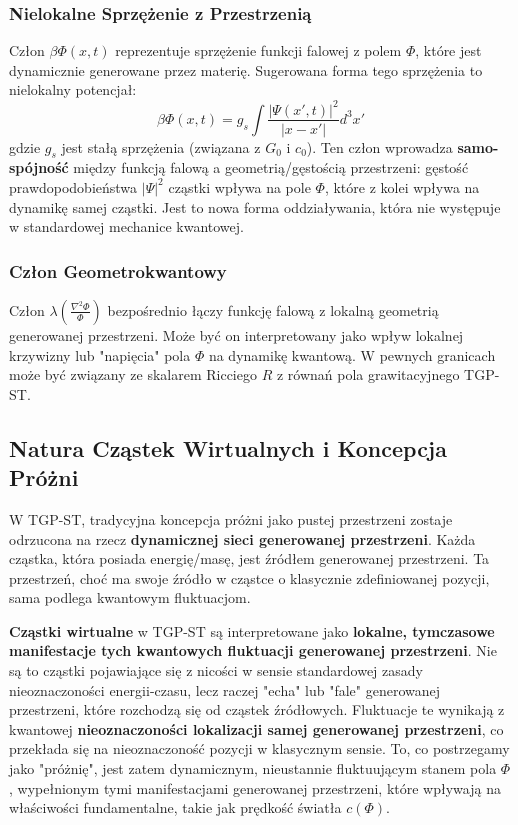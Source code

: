 \documentclass[11pt,a4paper]{article}
\begin{document}
\subsubsection{Nielokalne Sprzężenie z Przestrzenią}
Człon $\beta\Phi(x,t)$ reprezentuje sprzężenie funkcji falowej z polem $\Phi$, które jest dynamicznie generowane przez materię. Sugerowana forma tego sprzężenia to nielokalny potencjał:
\begin{equation}
    \beta\Phi(x,t)=g_s\int \frac{|\Psi(x',t)|^2}{|x-x'|}d^3x'
    \label{eq:NonlocalCoupling}
\end{equation}
gdzie $g_s$ jest stałą sprzężenia (związana z $G_0$ i $c_0$). Ten człon wprowadza \textbf{samo-spójność} między funkcją falową a geometrią/gęstością przestrzeni: gęstość prawdopodobieństwa $|\Psi|^2$ cząstki wpływa na pole $\Phi$, które z kolei wpływa na dynamikę samej cząstki. Jest to nowa forma oddziaływania, która nie występuje w standardowej mechanice kwantowej.

\subsubsection{Człon Geometrokwantowy}
Człon $\lambda\left(\frac{\nabla^2\Phi}{\Phi}\right)$ bezpośrednio łączy funkcję falową z lokalną geometrią generowanej przestrzeni. Może być on interpretowany jako wpływ lokalnej krzywizny lub "napięcia" pola $\Phi$ na dynamikę kwantową. W pewnych granicach może być związany ze skalarem Ricciego $R$ z równań pola grawitacyjnego TGP-ST.

\subsection{Natura Cząstek Wirtualnych i Koncepcja Próżni}
W TGP-ST, tradycyjna koncepcja próżni jako pustej przestrzeni zostaje odrzucona na rzecz \textbf{dynamicznej sieci generowanej przestrzeni}. Każda cząstka, która posiada energię/masę, jest źródłem generowanej przestrzeni. Ta przestrzeń, choć ma swoje źródło w cząstce o klasycznie zdefiniowanej pozycji, sama podlega kwantowym fluktuacjom.

\textbf{Cząstki wirtualne} w TGP-ST są interpretowane jako \textbf{lokalne, tymczasowe manifestacje tych kwantowych fluktuacji generowanej przestrzeni}. Nie są to cząstki pojawiające się z nicości w sensie standardowej zasady nieoznaczoności energii-czasu, lecz raczej "echa" lub "fale" generowanej przestrzeni, które rozchodzą się od cząstek źródłowych. Fluktuacje te wynikają z kwantowej \textbf{nieoznaczoności lokalizacji samej generowanej przestrzeni}, co przekłada się na nieoznaczoność pozycji w klasycznym sensie. To, co postrzegamy jako "próżnię", jest zatem dynamicznym, nieustannie fluktuującym stanem pola $\Phi$, wypełnionym tymi manifestacjami generowanej przestrzeni, które wpływają na właściwości fundamentalne, takie jak prędkość światła $c(\Phi)$.
\end{document}
